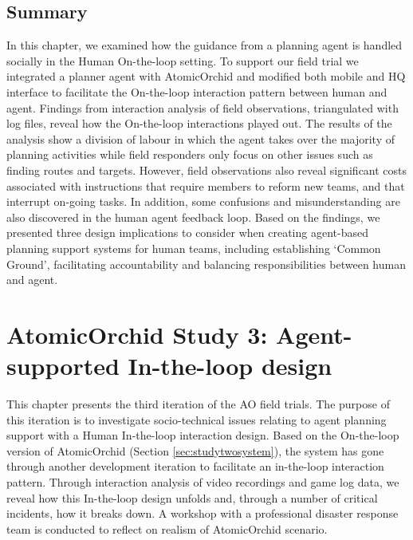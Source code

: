 \section{Summary}

In this chapter, we examined how the guidance from a planning agent is handled socially in the Human On-the-loop setting. To support our field trial we integrated a planner agent with AtomicOrchid and modified both mobile and HQ interface to facilitate the On-the-loop interaction pattern between human and agent. Findings from interaction analysis of field observations, triangulated with log files, reveal how the On-the-loop interactions played out. The results of the analysis show a division of labour in which the agent takes over the majority of planning activities while field responders only focus on other issues such as finding routes and targets. However, field observations also reveal significant costs associated with instructions that require members to reform new teams, and that interrupt on-going tasks. In addition, some confusions and misunderstanding are also discovered in the human agent feedback loop. Based on the findings, we presented three design implications to consider when creating agent-based planning support systems for human teams, including establishing `Common Ground', facilitating accountability and balancing responsibilities between human and agent.\\


\chapter{AtomicOrchid Study 3: Agent-supported In-the-loop design}\label{ch:studythree} 
This chapter presents the third iteration of the \acf{AO} field trials. The purpose of this iteration is to investigate socio-technical issues relating to agent planning support with a Human In-the-loop interaction design. Based on the On-the-loop version of AtomicOrchid (Section \ref{sec:studytwosystem}), the system has gone through another development iteration to facilitate an in-the-loop interaction pattern. Through interaction analysis of video recordings and game log data, we reveal how this In-the-loop design unfolds and, through a number of critical incidents, how it breaks down. A workshop with a professional disaster response team is conducted to reflect on realism of AtomicOrchid scenario. \\


